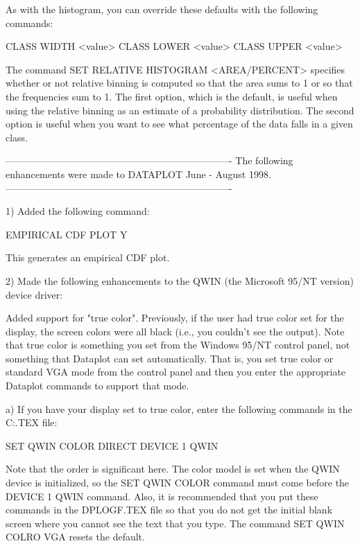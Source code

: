 {    As with the histogram, you can override these defaults with the
    following commands:

       CLASS WIDTH <value>
       CLASS LOWER <value>
       CLASS UPPER <value>

    The command SET RELATIVE HISTOGRAM <AREA/PERCENT> specifies
    whether or not relative binning is computed so that the area
    sums to 1 or so that the frequencies sum to 1.  The first option,
    which is the default, is useful when using the
    relative binning as an estimate of a probability distribution.
    The second option is useful when you want to see what percentage
    of the data falls in a given class.

----------------------------------------------------------------------
The following enhancements were made to DATAPLOT June - August   1998.
----------------------------------------------------------------------

 1) Added the following command:

      EMPIRICAL CDF PLOT Y

    This generates an empirical CDF plot.

 2) Made the following enhancements to the QWIN (the Microsoft
    95/NT version) device driver:

    Added support for "true color".  Previously, if the user
    had true color set for the display, the screen colors were
    all black (i.e., you couldn't see the output).  
    Note that true color is something you set from the 
    Windows 95/NT control panel, not something that Dataplot
    can set automatically.  That is, you set true color or
    standard VGA mode from the control panel and then you
    enter the appropriate Dataplot commands to support that
    mode.

    a) If you have your display set to true color, enter the
       following commands in the C:\DPLOGF.TEX file:

           SET QWIN COLOR DIRECT
           DEVICE 1 QWIN

       Note that the order is significant here.  The color model
       is set when the QWIN device is initialized, so the 
       SET QWIN COLOR command must come before the DEVICE 1 QWIN
       command.  Also, it is recommended that you put these commands
       in the DPLOGF.TEX file so that you do not get the initial
       blank screen where you cannot see the text that you type.
       The command SET QWIN COLRO VGA resets the default.

}

